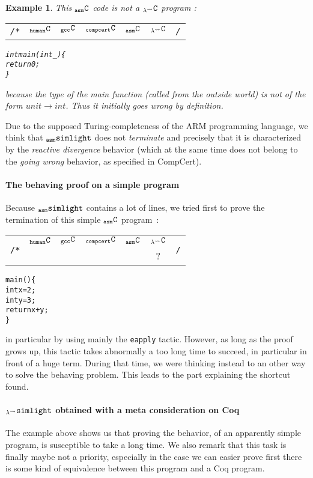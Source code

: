 \documentclass[a4paper, 11pt]{article}
\newenvironment{humC}
  {%
   \begin{alltt}
   \footnotesize}
  {\end{alltt} %
  }
\newcommand{\ccert}{CompCert\xspace}
\newcommand{\yes}{\ding{51}}
\newcommand{\no}{\ding{55}}
\newcommand{\aSL}{$_{\tt asm}{\tt simlight}$\xspace} %
\newcommand{\lSL}{$_{\lambda^\leadsto}{\tt simlight}$\xspace}
\newcommand{\C}{$_{\tt compcert}{\tt C}$\xspace}
\newcommand{\gccC}{$_{\tt gcc}{\tt C}$\xspace}
\newcommand{\hC}{$_{\tt human}{\tt C}$\xspace}
\newcommand{\aC}{$_{\tt asm}{\tt C}$\xspace}
\newcommand{\lC}{$_{\lambda^\leadsto}{\tt C}$\xspace}
\newcommand{\outworld}{the outside world\xspace}
\newtheorem{ex}{Example}[subsection]
\begin{document}
\begin{ex}
This \aC code is not a \lC program :
{\newline\tiny
\begin{tabular}{rc|c|c|c|cl}
\multirow{2}{*}{{\footnotesize{\tt /*}}} & \hC  & \gccC  & \C & \aC & \lC & \multirow{2}{*}{{\footnotesize{\tt */}}} \\
 & \yes & \yes & \yes & \yes & \no \\
\end{tabular}}
\begin{humC}
int main(int _) \{
  return 0;
\}
\end{humC}
because the type of the main function (called from \outworld) is not of the form $unit\rightarrow int$. Thus it initially goes wrong by definition.
\end{ex}

Due to the supposed Turing-completeness of the ARM programming language, we think that \aSL does not \emph{terminate} and precisely that it is characterized by the \emph{reactive divergence} behavior (which at the same time does not belong to the \emph{going wrong} behavior, as specified in \ccert).

\paragraph{The behaving proof on a simple program}
Because \aSL contains a lot of lines, we tried first to prove the termination of this simple \aC program~:
{\newline\tiny
\begin{tabular}{rc|c|c|c|cl}
\multirow{2}{*}{{\footnotesize{\tt /*}}} & \hC  & \gccC  & \C & \aC & \lC & \multirow{2}{*}{{\footnotesize{\tt */}}} \\
 & \yes & \yes & \yes & \yes & ? \\
\end{tabular}}
\begin{humC}
main() \{
  int x = 2;
  int y = 3;
  return x + y;
\}
\end{humC}
in particular by using mainly the \verb|eapply| tactic. However, as long as the proof grows up, this tactic takes abnormally a too long time to succeed, in particular in front of a huge term. During that time, we were thinking instead to an other way to solve the behaving problem. This leads to the part explaining the shortcut found.
\paragraph{\lSL obtained with a meta consideration on Coq}
The example above shows us that proving the behavior, of an apparently simple program, is susceptible to take a long time. We also remark that this task is finally maybe not a priority, especially in the case we can easier prove first there is some kind of equivalence between this program and a Coq program.
\end{document}
